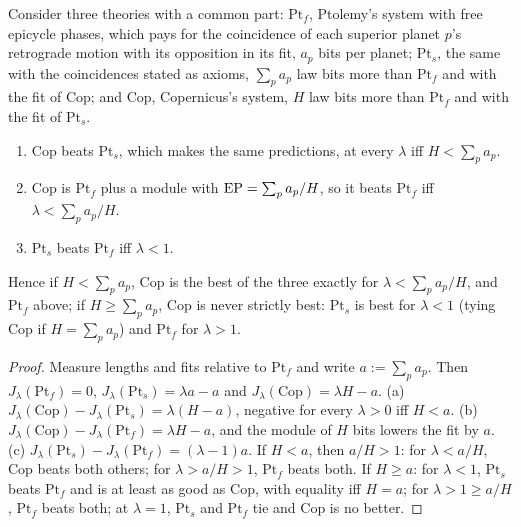 \begin{proposition}\label{prop:laws:copernicus}
Consider three theories with a common part: $\mathrm{Pt}_f$, Ptolemy's system with free epicycle phases, which pays for the coincidence of each superior planet $p$'s retrograde motion with its opposition in its fit, $a_p$ bits per planet; $\mathrm{Pt}_s$, the same with the coincidences stated as axioms, $\sum_pa_p$ law bits more than $\mathrm{Pt}_f$ and with the fit of $\mathrm{Cop}$; and $\mathrm{Cop}$, Copernicus's system, $H$ law bits more than $\mathrm{Pt}_f$ and with the fit of $\mathrm{Pt}_s$.
\begin{enumerate}[label=(\alph*),itemsep=1pt,topsep=2pt]
\item $\mathrm{Cop}$ beats $\mathrm{Pt}_s$, which makes the same predictions, at every $\lambda$ iff $H<\sum_pa_p$.
\item $\mathrm{Cop}$ is $\mathrm{Pt}_f$ plus a module with $\mathrm{EP}=\sum_pa_p/H$, so it beats $\mathrm{Pt}_f$ iff $\lambda<\sum_pa_p/H$.
\item $\mathrm{Pt}_s$ beats $\mathrm{Pt}_f$ iff $\lambda<1$.
\end{enumerate}
Hence if $H<\sum_pa_p$, $\mathrm{Cop}$ is the best of the three exactly for $\lambda<\sum_pa_p/H$, and $\mathrm{Pt}_f$ above; if $H\ge\sum_pa_p$, $\mathrm{Cop}$ is never strictly best: $\mathrm{Pt}_s$ is best for $\lambda<1$ (tying $\mathrm{Cop}$ if $H=\sum_pa_p$) and $\mathrm{Pt}_f$ for $\lambda>1$.
\end{proposition}

\begin{proof}
Measure lengths and fits relative to $\mathrm{Pt}_f$ and write $a:=\sum_pa_p$. Then $J_\lambda(\mathrm{Pt}_f)=0$, $J_\lambda(\mathrm{Pt}_s)=\lambda a-a$ and $J_\lambda(\mathrm{Cop})=\lambda H-a$. (a) $J_\lambda(\mathrm{Cop})-J_\lambda(\mathrm{Pt}_s)=\lambda(H-a)$, negative for every $\lambda>0$ iff $H<a$. (b) $J_\lambda(\mathrm{Cop})-J_\lambda(\mathrm{Pt}_f)=\lambda H-a$, and the module of $H$ bits lowers the fit by $a$. (c) $J_\lambda(\mathrm{Pt}_s)-J_\lambda(\mathrm{Pt}_f)=(\lambda-1)a$. If $H<a$, then $a/H>1$: for $\lambda<a/H$, $\mathrm{Cop}$ beats both others; for $\lambda>a/H>1$, $\mathrm{Pt}_f$ beats both. If $H\ge a$: for $\lambda<1$, $\mathrm{Pt}_s$ beats $\mathrm{Pt}_f$ and is at least as good as $\mathrm{Cop}$, with equality iff $H=a$; for $\lambda>1\ge a/H$, $\mathrm{Pt}_f$ beats both; at $\lambda=1$, $\mathrm{Pt}_s$ and $\mathrm{Pt}_f$ tie and $\mathrm{Cop}$ is no better.
\end{proof}

